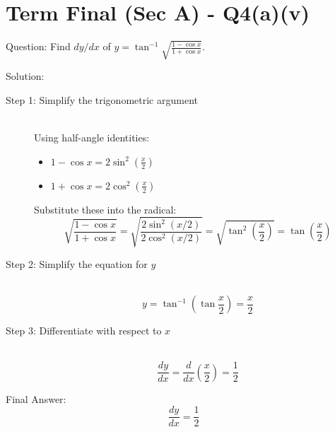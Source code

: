 \documentclass[11pt, a4paper]{article}
\begin{document}
\section*{Term Final (Sec A) - Q4(a)(v)}

Question:
Find $dy/dx$ of $y = \tan^{-1} \sqrt{\frac{1-\cos x}{1+\cos x}}$.

Solution:

\begin{description}
    \item[Step 1: Simplify the trigonometric argument] \ \\
    Using half-angle identities:
    \begin{itemize}
        \item $1 - \cos x = 2\sin^2\left(\frac{x}{2}\right)$
        \item $1 + \cos x = 2\cos^2\left(\frac{x}{2}\right)$
    \end{itemize}
    Substitute these into the radical:
    \[ \sqrt{\frac{1-\cos x}{1+\cos x}} = \sqrt{\frac{2\sin^2(x/2)}{2\cos^2(x/2)}} = \sqrt{\tan^2\left(\frac{x}{2}\right)} = \tan\left(\frac{x}{2}\right) \]

    \item[Step 2: Simplify the equation for $y$] \ \\
    \[ y = \tan^{-1}\left(\tan\frac{x}{2}\right) = \frac{x}{2} \]

    \item[Step 3: Differentiate with respect to $x$] \ \\
    \[ \frac{dy}{dx} = \frac{d}{dx}\left(\frac{x}{2}\right) = \frac{1}{2} \]
\end{description}

Final Answer:
\[ 
\boxed{\frac{dy}{dx} = \frac{1}{2}} 
\]

\end{document}
